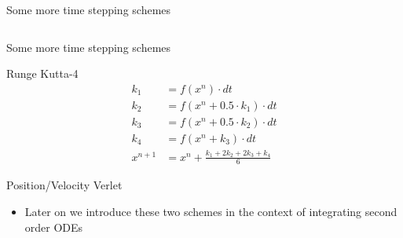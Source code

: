 \documentclass[presentation]{beamer}
\begin{document}
\begin{frame}[label={sec:orgf058c4b}]{Some more time stepping schemes}
\begin{columns}
\begin{column}{0.4\columnwidth}
\begin{center}
\end{center}
\end{column}
\end{columns}
\end{frame}
\begin{frame}[label={sec:orga14d910}]{Some more time stepping schemes}
\begin{block}{Runge Kutta-4}
\begin{equation*}
\begin{aligned}
{k}_1 &= {f}({x}^{n}) \cdot dt \\
{k}_2 &= {f}({x}^{n} + 0.5 \cdot {k}_1)\cdot dt \\
{k}_3 &= {f}({x}^{n} + 0.5 \cdot {k}_2)\cdot dt \\
{k}_4 &= {f}({x}^{n} + {k}_3)\cdot dt \\
{x}^{n+1} &= {x}^{n} + \frac{{k}_1+2{k}_2+2{k}_3+{k}_4}{6}
\end{aligned}
\end{equation*}
\end{block}
\begin{block}{Position/Velocity Verlet}
\begin{itemize}
\item Later on we introduce these two schemes in the context of integrating
second order ODEs
\end{itemize}
\end{block}
\end{frame}
\end{document}
